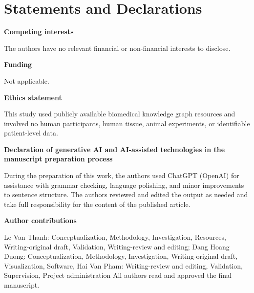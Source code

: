 \documentclass[pdflatex,sn-mathphys-num]{sn-jnl}
\newcommand{\softfuse}{SoftFuse-KGC}
\begin{document}

\section*{Statements and Declarations}

\noindent\textbf{Competing interests}\par
\noindent The authors have no relevant financial or non-financial interests to disclose.\par\smallskip

\noindent\textbf{Funding}\par
\noindent Not applicable.\par\smallskip

\noindent\textbf{Ethics statement}\par
\noindent This study used publicly available biomedical knowledge graph resources and involved no human participants, human tissue, animal experiments, or identifiable patient-level data.\par\smallskip

\noindent\textbf{Declaration of generative AI and AI-assisted technologies in the manuscript preparation process}\par\nobreak
\noindent During the preparation of this work, the authors used ChatGPT (OpenAI) for assistance with grammar checking, language polishing, and minor improvements to sentence structure. The authors reviewed and edited the output as needed and take full responsibility for the content of the published article. \par\smallskip

\noindent\textbf{Author contributions}\par
\noindent Le Van Thanh: Conceptualization, Methodology, Investigation, Resources, Writing-original draft, Validation, Writing-review and editing; Dang Hoang Duong: Conceptualization, Methodology, Investigation, Writing-original draft, Visualization, Software, Hai Van Pham: Writing-review and editing, Validation, Supervision, Project administration All authors read and approved the final manuscript.\par\smallskip
\end{document}

